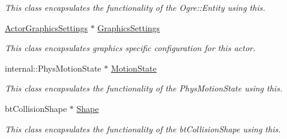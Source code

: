 \begin{DoxyCompactItemize}
\begin{DoxyCompactList}\small\item\em This class encapsulates the functionality of the Ogre::Entity using this. \item\end{DoxyCompactList}\item 
\hypertarget{classMezzanine_1_1ActorBase_ae0bd045c27c10a959a11895b3cd6e73c}{
\hyperlink{classMezzanine_1_1ActorGraphicsSettings}{ActorGraphicsSettings} $\ast$ \hyperlink{classMezzanine_1_1ActorBase_ae0bd045c27c10a959a11895b3cd6e73c}{GraphicsSettings}}
\label{classMezzanine_1_1ActorBase_ae0bd045c27c10a959a11895b3cd6e73c}

\begin{DoxyCompactList}\small\item\em This class encapsulates graphics specific configuration for this actor. \item\end{DoxyCompactList}\item 
\hypertarget{classMezzanine_1_1ActorBase_a073d5307c4cb7a82f13133e8216f797b}{
internal::PhysMotionState $\ast$ \hyperlink{classMezzanine_1_1ActorBase_a073d5307c4cb7a82f13133e8216f797b}{MotionState}}
\label{classMezzanine_1_1ActorBase_a073d5307c4cb7a82f13133e8216f797b}

\begin{DoxyCompactList}\small\item\em This class encapsulates the functionality of the PhysMotionState using this. \item\end{DoxyCompactList}\item 
\hypertarget{classMezzanine_1_1ActorBase_a51fdd84432cc14bebfe2d7bbc52cd4a0}{
btCollisionShape $\ast$ \hyperlink{classMezzanine_1_1ActorBase_a51fdd84432cc14bebfe2d7bbc52cd4a0}{Shape}}
\label{classMezzanine_1_1ActorBase_a51fdd84432cc14bebfe2d7bbc52cd4a0}

\begin{DoxyCompactList}\small\item\em This class encapsulates the functionality of the btCollisionShape using this. \item\end{DoxyCompactList}\end{DoxyCompactItemize}
